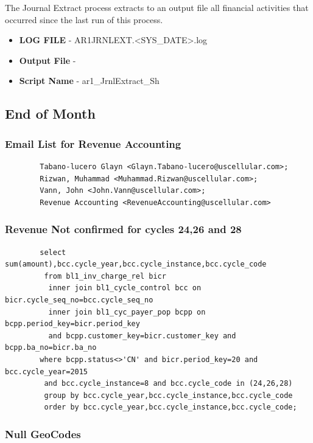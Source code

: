 \documentclass[12pt,twoside]{article}
\begin{document}
    The Journal Extract process extracts to an output file all financial activities that occurred since the last run of this process.
\begin{itemize}
\item \textbf{LOG FILE} - AR1JRNLEXT.<SYS\_DATE>.log
\item \textbf{Output File} -
\item \textbf{Script Name} - ar1\_JrnlExtract\_Sh
\end{itemize}
\subsection{End of Month}
\label{sec-11-3}
\subsubsection{Email List for Revenue Accounting}
\label{sec-11-3-1}

\begin{verbatim}
        Tabano-lucero Glayn <Glayn.Tabano-lucero@uscellular.com>; 
        Rizwan, Muhammad <Muhammad.Rizwan@uscellular.com>; 
        Vann, John <John.Vann@uscellular.com>;
        Revenue Accounting <RevenueAccounting@uscellular.com>
\end{verbatim}
\subsubsection{Revenue Not confirmed for cycles 24,26 and 28}
\label{sec-11-3-2}

\begin{verbatim}
        select sum(amount),bcc.cycle_year,bcc.cycle_instance,bcc.cycle_code
         from bl1_inv_charge_rel bicr 
          inner join bl1_cycle_control bcc on bicr.cycle_seq_no=bcc.cycle_seq_no 
          inner join bl1_cyc_payer_pop bcpp on bcpp.period_key=bicr.period_key 
          and bcpp.customer_key=bicr.customer_key and bcpp.ba_no=bicr.ba_no
        where bcpp.status<>'CN' and bicr.period_key=20 and bcc.cycle_year=2015 
         and bcc.cycle_instance=8 and bcc.cycle_code in (24,26,28)
         group by bcc.cycle_year,bcc.cycle_instance,bcc.cycle_code
         order by bcc.cycle_year,bcc.cycle_instance,bcc.cycle_code;
\end{verbatim}
\subsubsection{Null GeoCodes}
\label{sec-11-3-3}
\end{document}
